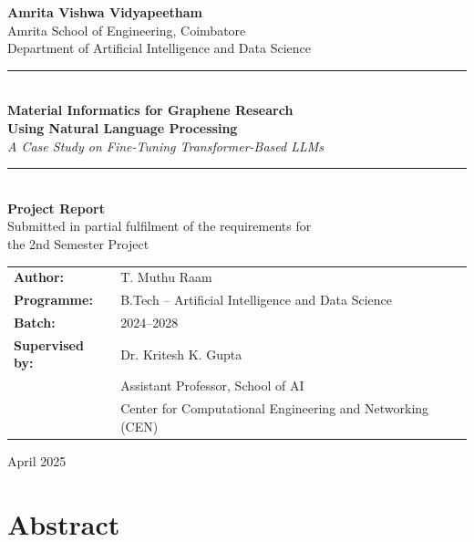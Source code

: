 \documentclass[12pt, a4paper]{report}
\begin{document}
\begin{titlepage}
    \centering
    \vspace*{1cm}

    {\Large \textbf{Amrita Vishwa Vidyapeetham}}\\[0.3cm]
    {\large Amrita School of Engineering, Coimbatore}\\[0.2cm]
    {\large Department of Artificial Intelligence and Data Science}\\[2cm]

    \rule{\textwidth}{1.5pt}\\[0.4cm]
    {\LARGE \textbf{Material Informatics for Graphene Research\\[0.3cm] Using Natural Language Processing}}\\[0.3cm]
    {\large \textit{A Case Study on Fine-Tuning Transformer-Based LLMs}}\\[0.2cm]
    \rule{\textwidth}{1.5pt}\\[2cm]

    {\large \textbf{Project Report}}\\[0.3cm]
    {\normalsize Submitted in partial fulfilment of the requirements for}\\[0.1cm]
    {\normalsize the 2nd Semester Project}\\[2cm]

    \begin{tabular}{ll}
        \textbf{Author:}     & T. Muthu Raam \\[0.3cm]
        \textbf{Programme:}  & B.Tech -- Artificial Intelligence and Data Science \\[0.3cm]
        \textbf{Batch:}      & 2024--2028 \\[0.3cm]
        \textbf{Supervised by:} & Dr. Kritesh K. Gupta \\
                             & Assistant Professor, School of AI \\
                             & Center for Computational Engineering and Networking (CEN) \\
    \end{tabular}

    \vfill
    {\large April 2025}
\end{titlepage}

\chapter*{Abstract}
\end{document}
